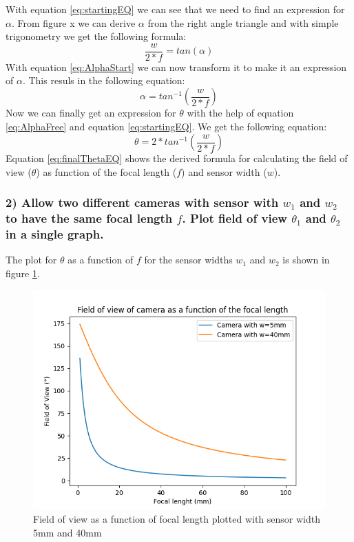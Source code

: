 \documentclass{article}
\begin{document}
    With equation \ref{eq:startingEQ} we can see that we need to find an expression for $\alpha$. From figure x we can derive $\alpha$ from the right angle triangle and with simple trigonometry we get the following formula:
    \begin{equation}
    \label{eq:AlphaStart}
        \frac{w}{2*f} = tan(\alpha)
    \end{equation}
    With equation \ref{eq:AlphaStart} we can now transform it to make it an expression of $\alpha$. This resuls in the following equation:
    \begin{equation}
    \label{eq:AlphaFree}
        \alpha = tan^{-1}\left(\frac{w}{2*f}\right)
    \end{equation}
    Now we can finally get an expression for $\theta$ with the help of equation \ref{eq:AlphaFree} and equation \ref{eq:startingEQ}. We get the following equation:
    \begin{equation}
    \label{eq:finalThetaEQ}
        \theta = 2*tan^{-1}\left(\frac{w}{2*f}\right)
    \end{equation}
    Equation \ref{eq:finalThetaEQ} shows the derived formula for calculating the field of view ($\theta$) as function of the focal length ($f$) and sensor width ($w$).
    \subsubsection*{2)  Allow two different cameras with sensor with $w_1$ and $w_2$ to have the same focal length $f$. Plot field of view $\theta_1$ and $\theta_2$ in a single graph.}
    The plot for $\theta$ as a function of $f$ for the sensor widths $w_1$ and $w_2$ is shown in figure \ref{fig:plot}.
    \begin{figure}[H]
        \centering
        \includegraphics[width=1\textwidth]{Q2.png}
        \caption{Field of view as a function of focal length plotted with sensor width 5mm and 40mm}
        \label{fig:plot}
    \end{figure}
\end{document}
